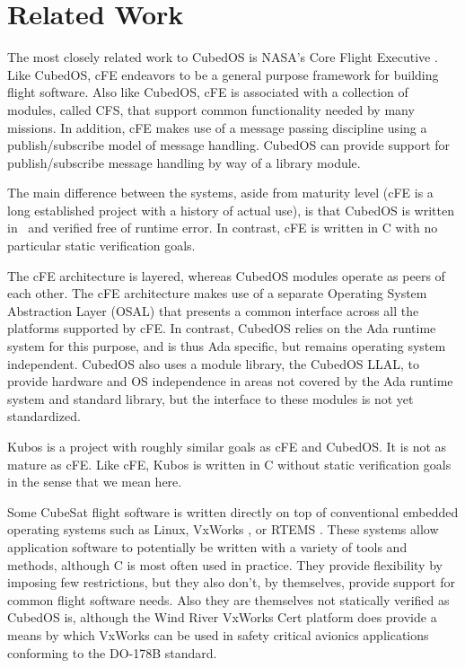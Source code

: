 
\section{Related Work}
\label{section-related-work}

The most closely related work to CubedOS is NASA's Core Flight Executive \cite{cFE}. Like
CubedOS, cFE endeavors to be a general purpose framework for building flight software. Also like
CubedOS, cFE is associated with a collection of modules, called CFS, that support common
functionality needed by many missions. In addition, cFE makes use of a message passing
discipline using a publish/subscribe model of message handling. CubedOS can provide support for
publish/subscribe message handling by way of a library module.

The main difference between the systems, aside from maturity level (cFE is a long established
project with a history of actual use), is that CubedOS is written in \SPARK\ and verified free
of runtime error. In contrast, cFE is written in C with no particular static verification goals.

The cFE architecture is layered, whereas CubedOS modules operate as peers of each other. The cFE
architecture makes use of a separate Operating System Abstraction Layer (OSAL) that presents a
common interface across all the platforms supported by cFE. In contrast, CubedOS relies on the
Ada runtime system for this purpose, and is thus Ada specific, but remains operating system
independent. CubedOS also uses a module library, the CubedOS LLAL, to provide hardware and OS
independence in areas not covered by the Ada runtime system and standard library, but the
interface to these modules is not yet standardized.

Kubos \cite{kubos} is a project with roughly similar goals as cFE and CubedOS. It is not as
mature as cFE. Like cFE, Kubos is written in C without static verification goals in the sense
that we mean here.

Some CubeSat flight software is written directly on top of conventional embedded operating
systems such as Linux, VxWorks \cite{vxworks}, or RTEMS \cite{rtems}. These systems allow
application software to potentially be written with a variety of tools and methods, although C
is most often used in practice. They provide flexibility by imposing few restrictions, but they
also don't, by themselves, provide support for common flight software needs. Also they are
themselves not statically verified as CubedOS is, although the Wind River VxWorks Cert platform
\cite{vxworks-cert} does provide a means by which VxWorks can be used in safety critical
avionics applications conforming to the DO-178B standard.
